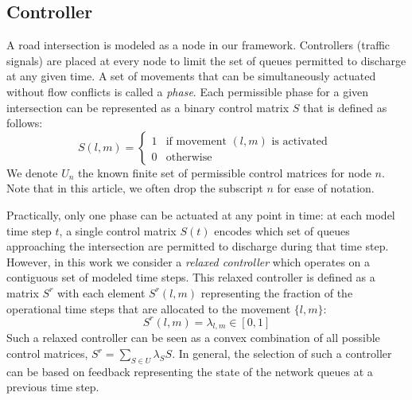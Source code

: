 \subsection*{Controller}
A road intersection is modeled as a node in our framework. Controllers (traffic signals) are placed at every node to limit the set of queues permitted to discharge at any given time. A set of movements that can be simultaneously actuated without flow conflicts is called a \emph{phase}.  Each permissible phase for a given intersection can be represented as a binary control matrix $S$ that is defined as follows: 
\begin{equation}
S(l,m) = \begin{cases}
        1 & \text{if movement $(l,m)$ is activated }  \\
        0 & \mbox{otherwise}
    \end{cases}
\end{equation}
We denote $U_n$ the known finite set of permissible control matrices for node $n$. Note that in this article, we often drop the subscript $n$ for ease of notation. 

Practically, only one phase can be actuated at any point in time: at each model time step $t$, a single control matrix $S(t)$ encodes which set of queues approaching the intersection are permitted to discharge during that time step. However, in this work we consider a \emph{relaxed controller} which operates on a contiguous set of modeled time steps. This relaxed controller is defined as a matrix $S^r$ with each element $S^r(l,m)$ representing the fraction of the operational time steps that are allocated to the movement $\{l,m\}$:
\begin{equation}\label{relaxed1}
S^r(l,m) = \lambda_{l,m} \in [0,1]
\end{equation}
Such a relaxed controller can be seen as a convex combination of all possible control matrices, $
S^r = \sum_{S\in U}\lambda_{S}S$. 
In general, the selection of such a controller can be based on feedback representing the state of the network queues at a previous time step.

\vspace{-.5em}
